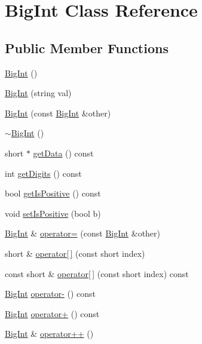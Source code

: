 \hypertarget{class_big_int}{}\section{Big\+Int Class Reference}
\label{class_big_int}
\subsection*{Public Member Functions}
\begin{DoxyCompactItemize}
\item 
\hyperlink{class_big_int_af677021c0987fc2a48da06837ed29c58}{Big\+Int} ()
\item 
\hyperlink{class_big_int_acebc402885a73f93cc50c0e7c07e0c1e}{Big\+Int} (string val)
\item 
\hyperlink{class_big_int_a35bd468d1f1b248fa8601e98d9e28095}{Big\+Int} (const \hyperlink{class_big_int}{Big\+Int} \&other)
\item 
\hyperlink{class_big_int_a2a8ffad37329b0a3649b88180406d12c}{$\sim$\+Big\+Int} ()
\item 
short $\ast$ \hyperlink{class_big_int_a380fe234cd3ea95706affc020b2493a4}{get\+Data} () const 
\item 
int \hyperlink{class_big_int_acf4f158035d5001cd102fc0b14b5d22d}{get\+Digits} () const 
\item 
bool \hyperlink{class_big_int_a4e870e916d8b09c0ad62cfa7f2ba8de0}{get\+Is\+Positive} () const 
\item 
void \hyperlink{class_big_int_a6bb113748317085a1c8e111fadeec13e}{set\+Is\+Positive} (bool b)
\item 
\hyperlink{class_big_int}{Big\+Int} \& \hyperlink{class_big_int_acf92dcbd39a0698cb36bf2cf65fefa7e}{operator=} (const \hyperlink{class_big_int}{Big\+Int} \&other)
\item 
short \& \hyperlink{class_big_int_acb6c7b1b053887bff5673f9cbd5833a6}{operator\mbox{[}$\,$\mbox{]}} (const short index)
\item 
const short \& \hyperlink{class_big_int_a5483010354528bf73d933cd36c5da11b}{operator\mbox{[}$\,$\mbox{]}} (const short index) const 
\item 
\hyperlink{class_big_int}{Big\+Int} \hyperlink{class_big_int_a56350bc8395ed38c2afdbb4554e56b1f}{operator-\/} () const 
\item 
\hyperlink{class_big_int}{Big\+Int} \hyperlink{class_big_int_a6aca3cff26d5c67d4189139b95b53e32}{operator+} () const 
\item 
\hyperlink{class_big_int}{Big\+Int} \& \hyperlink{class_big_int_a0f1a8a43867f25c8df48e7747012536f}{operator++} ()

\end{DoxyCompactItemize}
